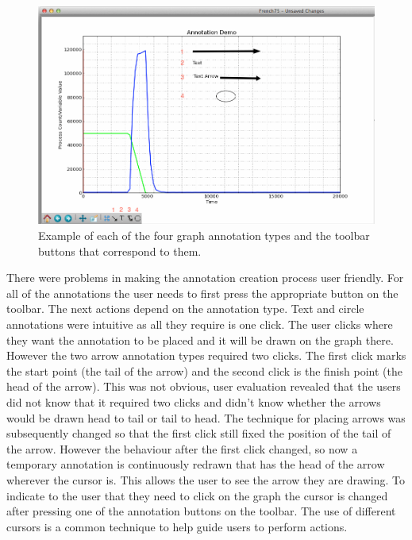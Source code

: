 \begin{figure}[h!]
    \centering
    \includegraphics[width=\textwidth]{images/annotation_demo.png}
    \caption{Example of each of the four graph annotation types and the toolbar buttons that correspond to them.}
    \label{fig:annotation_demo}
\end{figure}

There were problems in making the annotation creation process user friendly.  For all of the annotations the user needs to first press the appropriate button on the toolbar.  The next actions depend on the annotation type.  Text and circle annotations were intuitive as all they require is one click.  The user clicks where they want the annotation to be placed and it will be drawn on the graph there.  However the two arrow annotation types required two clicks.  The first click marks the start point (the tail of the arrow) and the second click is the finish point (the head of the arrow).  This was not obvious, user evaluation revealed that the users did not know that it required two clicks and didn't know whether the arrows would be drawn head to tail or tail to head.  The technique for placing arrows was subsequently changed so that the first click still fixed the position of the tail of the arrow. However the behaviour after the first click changed, so now a temporary annotation is continuously redrawn that has the head of the arrow wherever the cursor is.  This allows the user to see the arrow they are drawing.  To indicate to the user that they need to click on the graph the cursor is changed after pressing one of the annotation buttons on the toolbar.  The use of different cursors is a common technique to help guide users to perform actions.


